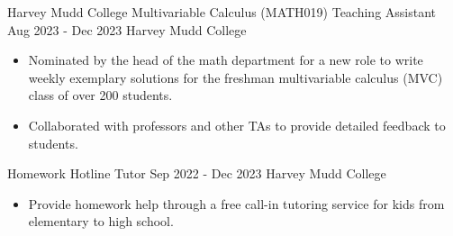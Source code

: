 \documentclass[9pt]{resume}
\begin{document}
\begin{experiencelist}
            {Harvey Mudd College}
            {}
        \experience 
            {Multivariable Calculus (MATH019) Teaching Assistant}
            {Aug 2023 - Dec 2023}
            {Harvey Mudd College}
            {\begin{itemize}[noitemsep, topsep=1pt] 
                \item Nominated by the head of the math department for a new role to write weekly exemplary solutions for the freshman multivariable calculus (MVC) class of over 200 students.
                \item Collaborated with professors and other TAs to provide detailed feedback to students. 
            \end{itemize}}
        \experience
            {Homework Hotline Tutor}
            {Sep 2022 - Dec 2023} 
            {Harvey Mudd College}
            {\begin{itemize}[noitemsep, topsep=1pt]
                \item Provide homework help through a free call-in tutoring service for kids from elementary to high school.
            \end{itemize}}
    \end{experiencelist}
    \vspace{-0.2cm}
\end{document}
